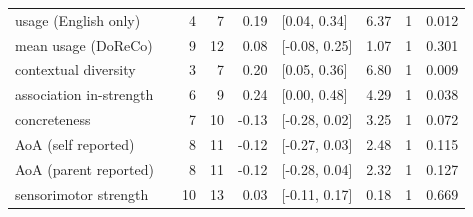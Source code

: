 \begin{table}[ht]
\begin{tabular}{llrrrlrrl}
  usage (English only) &  & 4 & 7 & 0.19 & [0.04, 0.34] & 6.37 & 1 & 0.012 \\ 
  mean usage (DoReCo) &  & 9 & 12 & 0.08 & [-0.08, 0.25] & 1.07 & 1 & 0.301 \\ 
  contextual diversity &  & 3 & 7 & 0.20 & [0.05, 0.36] & 6.80 & 1 & 0.009 \\ 
  association in-strength &  & 6 & 9 & 0.24 & [0.00, 0.48] & 4.29 & 1 & 0.038 \\ 
  concreteness &  & 7 & 10 & -0.13 & [-0.28, 0.02] & 3.25 & 1 & 0.072 \\ 
  AoA (self reported) &  & 8 & 11 & -0.12 & [-0.27, 0.03] & 2.48 & 1 & 0.115 \\ 
  AoA (parent reported) &  & 8 & 11 & -0.12 & [-0.28, 0.04] & 2.32 & 1 & 0.127 \\ 
  sensorimotor strength &  & 10 & 13 & 0.03 & [-0.11, 0.17] & 0.18 & 1 & 0.669 \\ 
   \hline
\end{tabular}
\end{table}
